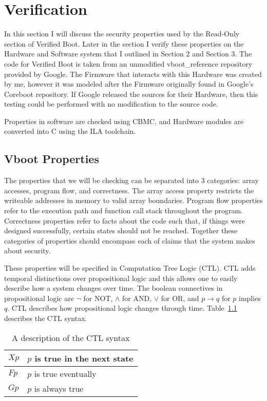 \chapter{Verification}\label{sec:Verif}

In this section I will discuss the security properties used by the Read-Only
section of Verified Boot. 
Later in the section I verify these properties on the Hardware and
Software system that I outlined in Section 2 and Section 3.
The code for Verified Boot is taken from an unmodified vboot\_reference repository provided by Google. 
The Firmware that interacts with this Hardware was created by me, however it was 
modeled after the Firmware originally found in Google's Coreboot repository. 
If Google released the sources for their Hardware, then this testing could be
performed with no modification to the source code. 

Properties in software are checked using CBMC, and Hardware modules are
converted into C using the ILA toolchain.

\section{Vboot Properties}

The properties that we will be checking can be separated into 3 categories: array accesses, program flow, and correctness.
The array access property restricts the writeable addresses in memory to valid array boundaries. 
Program flow properties refer to the execution path and function call stack throughout the program.
Correctness properties refer to facts about the code such that, if things were
designed successfully, certain states should not be reached.
Together these categories of properties should encompass each of claims that the system makes about security.

These properties will be specified in Computation Tree Logic (CTL). 
CTL adds temporal distinctions over propositional logic and this allows one to easily describe how a system changes over time.
The boolean connectives in propositional logic are $\lnot$ for NOT, $\land$ for
AND, $\lor$ for OR, and $p \to q$ for $p$ implies $q$.
CTL describes how propositional logic changes through time.
Table~\ref{ctl_syn} describes the CTL syntax.

\begin{table}[!htbp]
    \centering
    \caption{A description of the CTL syntax}\label{ctl_syn}
    \begin{tabular}{|l|l|}
        \hline
        $Xp$ & $p$ is true in the next state\\ \hline
        $Fp$ & $p$ is true eventually\\ \hline
        $Gp$ & $p$ is always true\\ \hline
    \end{tabular}
\end{table}

